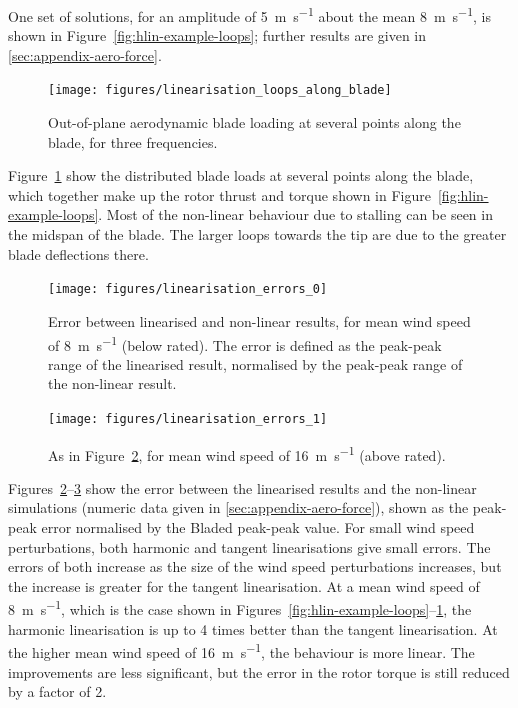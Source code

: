 \documentclass[preprint]{elsarticle}
\begin{document}
One set of solutions, for an amplitude of \SI{5}{\metre\per\second} about the
mean \SI{8}{\metre\per\second}, is shown in Figure~\ref{fig:hlin-example-loops};
further results are given in \ref{sec:appendix-aero-force}.

\begin{figure}
  \centering
  \texttt{[image: figures/linearisation\_loops\_along\_blade]}
  \caption{Out-of-plane aerodynamic blade loading at several points
    along the blade, for three frequencies.}
\label{fig:hlin-example-bladeloads}
\end{figure}

Figure~\ref{fig:hlin-example-bladeloads} show the distributed blade loads at
several points along the blade, which together make up the rotor thrust and
torque shown in Figure~\ref{fig:hlin-example-loops}. Most of the non-linear
behaviour due to stalling can be seen in the midspan of the blade. The larger
loops towards the tip are due to the greater blade deflections there.

\begin{figure}[p]
  \centering
  \hspace*{-1.5cm}\texttt{[image: figures/linearisation\_errors\_0]}
  \caption{Error between linearised and non-linear results, for mean
    wind speed of \SI{8}{\metre\per\second} (below rated). The error
    is defined as the peak-peak range of the linearised result,
    normalised by the peak-peak range of the non-linear result.}
\label{fig:hlin-errors-rms-1}
\end{figure}
\begin{figure}[p]
  \centering
  \hspace*{-1.5cm}\texttt{[image: figures/linearisation\_errors\_1]}
  \caption{As in Figure~\ref{fig:hlin-errors-rms-1}, for mean wind speed of
    \SI{16}{\metre\per\second} (above rated).}
\label{fig:hlin-errors-rms-2}
\end{figure}

Figures~\ref{fig:hlin-errors-rms-1}--\ref{fig:hlin-errors-rms-2} show the error
between the linearised results and the non-linear simulations (numeric data given
in \ref{sec:appendix-aero-force}), shown as the peak-peak error normalised by
the Bladed peak-peak value. For small wind speed perturbations, both harmonic
and tangent linearisations give small errors. The errors of both increase as the
size of the wind speed perturbations increases, but the increase is greater for
the tangent linearisation. At a mean wind speed of \SI{8}{\metre\per\second},
which is the case shown in
Figures~\ref{fig:hlin-example-loops}--\ref{fig:hlin-example-bladeloads}, the
harmonic linearisation is up to \num{4} times better than the tangent
linearisation. At the higher mean wind speed of \SI{16}{\metre\per\second}, the
behaviour is more linear. The improvements are less significant, but the error
in the rotor torque is still reduced by a factor of \num{2}.
\end{document}
